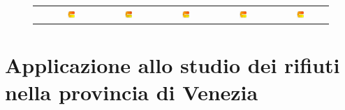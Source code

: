 \documentclass[landscape,9pt]{beamer}                           %
\begin{document}
\begin{frame}
\begin{figure}
\begin{tabular}{lccccc}
\parbox[t]{2mm}{}&
\includegraphics[width=0.16\textwidth,valign=t]{Immagini/simulazioni/REALEtempo4.png}&
\includegraphics[width=0.16\textwidth,valign=t]{Immagini/simulazioni/KRIGtempo4.png}&
\includegraphics[width=0.16\textwidth,valign=t]{Immagini/simulazioni/TPStempo4.png}&
\includegraphics[width=0.16\textwidth,valign=t]{Immagini/simulazioni/SOAPtempo4.png}&
\includegraphics[width=0.16\textwidth,valign=t]{Immagini/simulazioni/STSRtempo4.png}
\end{tabular}
\end{figure}
\end{frame}

\section{Applicazione allo studio dei rifiuti nella provincia di Venezia}
\end{document}
